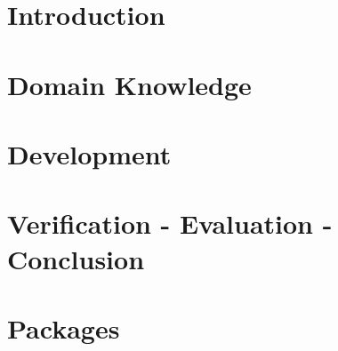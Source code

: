 \documentclass[10pt,a4paper,bibliography=totoc]{scrbook}
\begin{document}
    
   
 

\tableofcontents
\newpage

\listoffigures
\newpage

\listofcodes
\cleardoublepage

%


\newpage

\part{Introduction}
 

\part{Domain Knowledge}  





\part{Development}





\part{Verification - Evaluation - Conclusion}


\part{Packages}





\newpage

\printindex
\end{document}
